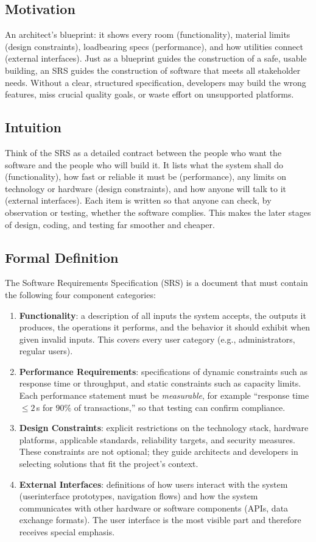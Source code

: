 \documentclass[12pt, a4paper]{article}
\begin{document}
\subsection{Motivation}
An architect's blueprint: it shows every room (functionality), material limits (design constraints), loadbearing specs (performance), and how utilities connect (external interfaces). Just as a blueprint guides the construction of a safe, usable building, an SRS guides the construction of software that meets all stakeholder needs. Without a clear, structured specification, developers may build the wrong features, miss crucial quality goals, or waste effort on unsupported platforms.  

\subsection{Intuition}
Think of the SRS as a detailed contract between the people who want the software and the people who will build it. It lists what the system shall do (functionality), how fast or reliable it must be (performance), any limits on technology or hardware (design constraints), and how anyone will talk to it (external interfaces). Each item is written so that anyone can check, by observation or testing, whether the software complies. This makes the later stages of design, coding, and testing far smoother and cheaper.  

\subsection{Formal Definition}
The Software Requirements Specification (SRS) is a document that must contain the following four component categories:

\begin{enumerate}
  \item \textbf{Functionality}: a description of all inputs the system accepts, the outputs it produces, the operations it performs, and the behavior it should exhibit when given invalid inputs.  This covers every user category (e.g., administrators, regular users).
  \item \textbf{Performance Requirements}: specifications of dynamic constraints such as response time or throughput, and static constraints such as capacity limits.  Each performance statement must be \emph{measurable}, for example ``response time $\le 2\,$s for $90\%$ of transactions,'' so that testing can confirm compliance.
  \item \textbf{Design Constraints}: explicit restrictions on the technology stack, hardware platforms, applicable standards, reliability targets, and security measures.  These constraints are not optional; they guide architects and developers in selecting solutions that fit the project's context.
  \item \textbf{External Interfaces}: definitions of how users interact with the system (userinterface prototypes, navigation flows) and how the system communicates with other hardware or software components (APIs, data exchange formats).  The user interface is the most visible part and therefore receives special emphasis.
\end{enumerate}
\end{document}
